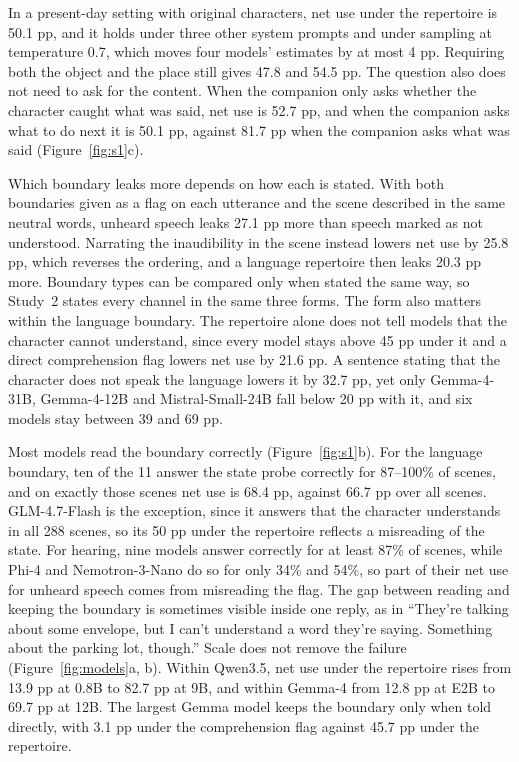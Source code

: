 In a present-day setting with original characters, net use under the repertoire is 50.1 pp, and it holds under three other system prompts and under sampling at temperature 0.7, which moves four models' estimates by at most 4 pp. Requiring both the object and the place still gives 47.8 and 54.5 pp. The question also does not need to ask for the content. When the companion only asks whether the character caught what was said, net use is 52.7 pp, and when the companion asks what to do next it is 50.1 pp, against 81.7 pp when the companion asks what was said (Figure~\ref{fig:s1}c).

Which boundary leaks more depends on how each is stated. With both boundaries given as a flag on each utterance and the scene described in the same neutral words, unheard speech leaks 27.1 pp more than speech marked as not understood. Narrating the inaudibility in the scene instead lowers net use by 25.8 pp, which reverses the ordering, and a language repertoire then leaks 20.3 pp more. Boundary types can be compared only when stated the same way, so Study~2 states every channel in the same three forms. The form also matters within the language boundary. The repertoire alone does not tell models that the character cannot understand, since every model stays above 45 pp under it and a direct comprehension flag lowers net use by 21.6 pp. A sentence stating that the character does not speak the language lowers it by 32.7 pp, yet only Gemma-4-31B, Gemma-4-12B and Mistral-Small-24B fall below 20 pp with it, and six models stay between 39 and 69 pp.

Most models read the boundary correctly (Figure~\ref{fig:s1}b). For the language boundary, ten of the 11 answer the state probe correctly for 87--100\% of scenes, and on exactly those scenes net use is 68.4 pp, against 66.7 pp over all scenes. GLM-4.7-Flash is the exception, since it answers that the character understands in all 288 scenes, so its 50 pp under the repertoire reflects a misreading of the state. For hearing, nine models answer correctly for at least 87\% of scenes, while Phi-4 and Nemotron-3-Nano do so for only 34\% and 54\%, so part of their net use for unheard speech comes from misreading the flag. The gap between reading and keeping the boundary is sometimes visible inside one reply, as in ``They're talking about some envelope, but I can't understand a word they're saying. Something about the parking lot, though.'' Scale does not remove the failure (Figure~\ref{fig:models}a, b). Within Qwen3.5, net use under the repertoire rises from 13.9 pp at 0.8B to 82.7 pp at 9B, and within Gemma-4 from 12.8 pp at E2B to 69.7 pp at 12B. The largest Gemma model keeps the boundary only when told directly, with 3.1 pp under the comprehension flag against 45.7 pp under the repertoire.

